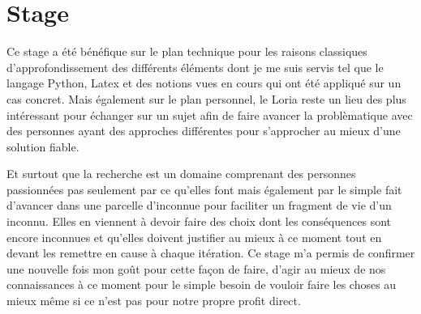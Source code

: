\section{Stage}

Ce stage a été bénéfique sur le plan technique pour les raisons classiques d'approfondissement des différents éléments dont je me suis servis tel que le langage Python, Latex et des notions vues en cours qui ont été appliqué sur un cas concret. Mais également sur le plan personnel, le Loria reste un lieu des plus intéressant pour échanger sur un sujet afin de faire avancer la problèmatique avec des personnes ayant des approches différentes pour s'approcher au mieux d'une solution fiable.

\bigbreak

Et surtout que la recherche est un domaine comprenant des personnes passionnées pas seulement par ce qu'elles font mais également par le simple fait d'avancer dans une parcelle d'inconnue pour faciliter un fragment de vie d'un inconnu. Elles en viennent à devoir faire des choix dont les conséquences sont encore inconnues et qu'elles doivent justifier au mieux à ce moment tout en devant les remettre en cause à chaque itération. Ce stage m'a permis de confirmer une nouvelle fois mon goût pour cette façon de faire, d'agir au mieux de nos connaissances à ce moment pour le simple besoin de vouloir faire les choses au mieux même si ce n'est pas pour notre propre profit direct.